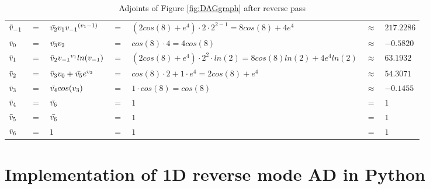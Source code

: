 \documentclass{article}
\begin{document}
\begin{table}[h!]
    \centering
    \begin{tabular}{|lclllll|}
        \hline
        $\Bar{v}_{-1}$ & $=$ & $\Bar{v_2}v_1 {v_{-1}}^{(v_{1}-1)}$ & $=$ & $(2cos(8)+e^4) \cdot 2 \cdot 2^{2-1} = 8cos(8)+4e^4$ & $\approx$ & $217.2286$\\
        $\Bar{v}_{0}$ & $=$ & $\Bar{v_3}v_2$ & $=$ & $cos(8)\cdot4 = 4cos(8)$ & $\approx$ & $-0.5820$\\
        \hline
        $\Bar{v}_{1}$ & $=$ & $\Bar{v}_{2}{v_{-1}}^{v_{1}}ln(v_{-1})$ & $=$ & $(2cos(8)+e^4) \cdot 2^2 \cdot ln(2) = 8cos(8)ln(2) +4e^4ln(2)$ & $\approx$ & $63.1932$\\
        $\Bar{v}_{2}$ & $=$ & $\Bar{v}_{3}v_0 + \Bar{v_5}e^{v_2}$ & $=$ & $cos(8) \cdot 2 + 1 \cdot e^{4} = 2cos(8)+e^4$ & $\approx$ & $54.3071$\\
        $\Bar{v}_{3}$ & $=$ & $\Bar{v_4}cos(v_3)$ & $=$ & $1 \cdot cos(8) = cos(8)$ & $\approx$ & $-0.1455$\\
        $\Bar{v}_{4}$ & $=$ & $\Bar{v_6}$ & $=$ & $1$ & $=$ & $1$\\
        $\Bar{v}_{5}$ & $=$ & $\Bar{v_6}$ & $=$ & $1$ & $=$ & $1$\\
        \hline
        $\Bar{v}_{6}$ & $=$ & $1$ & $=$ & $1$ & $=$ & $1$\\
        \hline
    \end{tabular}
    \caption{Adjoints of Figure \ref{fig:DAGgraph} after reverse pass}
    \label{tab:example1RP}
\end{table}

\section{Implementation of 1D reverse mode AD in Python}
\end{document}
